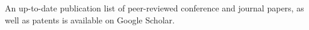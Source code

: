 \documentclass[11pt,a4paper,sans]{moderncv}        %
\begin{document}
An up-to-date publication list of peer-reviewed conference and journal papers, as well as patents is available on Google Scholar\footnotemark.
\vspace{4mm}
\newpage
\nocite{*}






\end{document}

